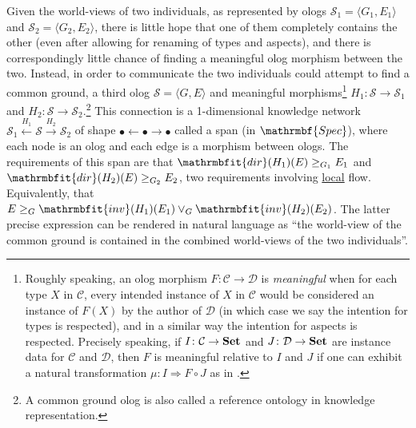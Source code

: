 \documentclass{amsart}
\def\to{\rightarrow}
\def\taking{\colon}
\def\Set{{\bf Set}}
\def\mcC{{\mathcal C}}
\def\mcD{{\mathcal D}}
\theoremstyle{remark}
\theoremstyle{definition}
\begin{document}
Given the world-views of two individuals,
as represented by ologs 
$\mathcal{S}_{1} = {\langle{G_{1},E_{1}}\rangle}$ and $\mathcal{S}_{2} = {\langle{G_{2},E_{2}}\rangle}$,
there is little hope that one of them completely contains the other 
(even after allowing for renaming of types and aspects), 
and there is correspondingly little chance of finding a meaningful 
olog morphism between the two.
Instead, 
in order to communicate
the two individuals could attempt to find a common ground, 
a third olog $\mathcal{S} = {\langle{G,E}\rangle}$ 
and meaningful morphisms\footnote{Roughly speaking,
an olog morphism $F \colon \mathcal{C} \to \mathcal{D}$ is {\em meaningful} when for each type $X$ in $\mcC$, 
every intended instance of $X$ in $\mcC$ would be considered an instance of $F(X)$ by the author of $\mcD$ 
(in which case we say the intention for types is respected), 
and in a similar way the intention for aspects is respected.  
Precisely speaking,
if $I\taking\mcC\to\Set$ and $J\taking\mcD\to\Set$ are instance data for $\mcC$ and $\mcD$, 
then $F$ is meaningful relative to $I$ and $J$ 
if one can exhibit a natural transformation $\mu \taking I \Rightarrow F \circ J$ as in \cite{Spi-FDM}.}
%
$H_{1} \colon  \mathcal{S} \to \mathcal{S}_{1}$ and $H_{2} \colon \mathcal{S} \to \mathcal{S}_{2}$.\footnote{A common ground olog is also called a reference ontology in knowledge representation.}
%
This connection is a 1-dimensional knowledge network 
$\mathcal{S}_{1} \xleftarrow{H_{1}} \mathcal{S} \xrightarrow{H_{2}} \mathcal{S}_{2}$
of shape
$\bullet \leftarrow \bullet \rightarrow \bullet$
called a span (in $\mathrmbf{Spec}$), 
where each node is an olog and each edge is a morphism between ologs. 
%
%
The requirements of this span are that
$\mathrmbfit{dir}(H_{1})(E) \geq_{G_{1}} E_{1}$
and
$\mathrmbfit{dir}(H_{2})(E) \geq_{G_{2}} E_{2}$,
two requirements involving \underline{local} flow.
Equivalently, that
$E \geq_{G} \mathrmbfit{inv}(H_{1})(E_{1}) \vee_{G} \mathrmbfit{inv}(H_{2})(E_{2})$.
The latter precise expression can be rendered in natural language as
``the world-view of the common ground is contained in the combined world-views of the two individuals''.
\end{document}
